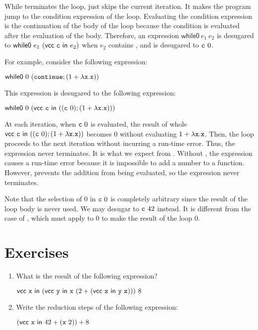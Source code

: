 While  terminates the loop,  just skips the current
iteration. It makes the program jump to the condition expression of the loop.
Evaluating the condition expression is the continuation of the body of the loop
because the condition is evaluated after the evaluation of the
body. Therefore, an expression $\textsf{while0}\ e_1\ e_2$ is desugared to
$\textsf{while0}\ e_1\ (\evcc{\code{c}}{e_2})$ when $e_2$ contains
, and  is desugared to $\code{c}\ 0$.

For example, consider the following expression:

$\textsf{while0}\ 0\ (\code{continue};(1+\efun{\cx}{\cx}))$

This expression is desugared to the following expression:

$\textsf{while0}\ 0\ (\evcc{\code{c}}{((\code{c}\ 0);(1+\efun{\cx}{\cx}))})$

At each iteration, when $\code{c}\ 0$ is evaluated,
the result of whole $\evcc{\code{c}}{((\code{c}\ 0);(1+\efun{\cx}{\cx}))}$ becomes
$0$ without evaluating $1+\lambda\texttt{x}.\texttt{x}$. Then, the loop proceeds to the
next iteration without incurring a run-time error. Thus, the expression never
terminates. It is what we expect from . Without ,
the expression causes a run-time error because it is impossible to add a number to
a function. However,  prevents the addition from being evaluated,
so the expression never terminates.

Note that the selection of $0$ in $\code{c}\ 0$ is completely arbitrary
since the result of the loop body is
never used. We may desugar  to $\texttt{c}\ 42$ instead. It is
different from the case of , which must apply  to $0$ to
make the result of the loop $0$.

\section{Exercises}

\begin{enumerate}
  \item What is the result of the following expression?

    $\evcc{\cx}{(\evcc{\cy}{\cx\ (2+(\evcc{\cz}{\cy\ \cz}))})\ 8}$

  \item Write the reduction steps of the following expression:

    $(\evcc{\cx}{42+(\cx\ 2)})+8$
\end{enumerate}
